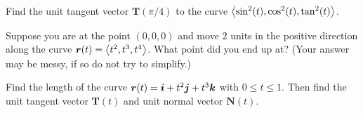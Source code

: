 \documentclass[12pt]{exam}
\begin{document}
\begin{questions}
\question Find the unit tangent vector \(\bm{T}(\pi/4)\) to the curve \(\left\langle \sin^2(t),\cos^2(t),\tan^2(t) \right\rangle\).
    
\ifprintanswers
        \begin{solution}

        \end{solution}
    \else
        \vfill
    \fi


\question Suppose you are at the point \((0,0,0)\) and move \(2\) units in the positive direction along the curve \(\bm{r}(t)=\left\langle t^2,t^3,t^4 \right\rangle\). What point did you end up at? (Your answer may be messy, if so do not try to simplify.)
\ifprintanswers
        \begin{solution}
            
        \end{solution}
    \else
        \vfill
    \fi    


    \question Find the length of the curve \(\bm{r}(t)=\bm{i}+t^2\bm{j}+t^3\bm{k}\) with \(0\le t\le 1\). Then find the unit tangent vector \(\bm{T}(t)\) and unit normal vector \(\bm{N}(t)\).
    

        \ifprintanswers
        \begin{solution}

        \end{solution}
    \else
        \vfill
    \fi     

\end{questions}
\end{document}
